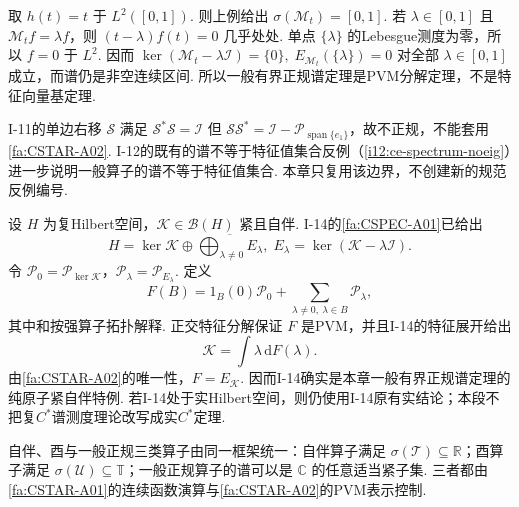 \begin{FAExample}[乘法算子模型族中的非原子正规谱]\label{ii03:nonatomic-example}
取 \(\displaystyle h(t)=t\) 于 \(\displaystyle L^2([0,1])\). 则上例给出
\(\displaystyle \sigma(\mathcal M_t)=[0,1].\)
若 \(\displaystyle\lambda\in[0,1]\) 且 \(\displaystyle\mathcal M_tf=\lambda f\)，则 \(\displaystyle(t-\lambda)f(t)=0\) 几乎处处. 单点 \(\displaystyle\{\lambda\}\) 的Lebesgue测度为零，所以 \(\displaystyle f=0\) 于 \(\displaystyle L^2\). 因而
\(\displaystyle \ker(\mathcal M_t-\lambda\mathcal I)=\{0\}, \; E_{\mathcal M_t}(\{\lambda\})=0\)
对全部 \(\displaystyle\lambda\in[0,1]\) 成立，而谱仍是非空连续区间. 所以一般有界正规谱定理是PVM分解定理，不是特征向量基定理.
\end{FAExample}

\begin{FARemark}[移位算子模型与谱不等于特征值集合的反例边界]
I-11的单边右移 \(\displaystyle\mathcal S\) 满足 \(\displaystyle\mathcal S^*\mathcal S=\mathcal I\) 但 \(\displaystyle\mathcal S\mathcal S^*=\mathcal I-\mathcal P_{\operatorname{span}\{e_1\}}\)，故不正规，不能套用\autoref{fa:CSTAR-A02}. I-12的既有的谱不等于特征值集合反例（\autoref{i12:ce-spectrum-noeig}）进一步说明一般算子的谱不等于特征值集合. 本章只复用该边界，不创建新的规范反例编号.
\end{FARemark}

\begin{FAApplication}[I-14紧自伴谱定理是纯原子特例]\label{ii03:i14-atomic-bridge}
设 \(\displaystyle H\) 为复Hilbert空间，\(\displaystyle\mathcal K\in\mathcal B(H)\) 紧且自伴. I-14的\autoref{fa:CSPEC-A01}已给出
\[
H
=\ker\mathcal K
\oplus
\overline{\bigoplus_{\lambda\neq0}E_\lambda},
\;
E_\lambda=\ker(\mathcal K-\lambda\mathcal I).
\]
令 \(\displaystyle\mathcal P_0=\mathcal P_{\ker\mathcal K}\)，\(\displaystyle\mathcal P_\lambda=\mathcal P_{E_\lambda}\). 定义
\[
F(B)
=1_B(0)\mathcal P_0
+
\sum_{\lambda\neq0,\ \lambda\in B}\mathcal P_\lambda,
\]
其中和按强算子拓扑解释. 正交特征分解保证 \(\displaystyle F\) 是PVM，并且I-14的特征展开给出
\[
\mathcal K=\int\lambda\,\mathrm{d}F(\lambda).
\]
由\autoref{fa:CSTAR-A02}的唯一性，\(\displaystyle F=E_{\mathcal K}\). 因而I-14确实是本章一般有界正规谱定理的纯原子紧自伴特例. 若I-14处于实Hilbert空间，则仍使用I-14原有实结论；本段不把复\(\displaystyle C^*\)谱测度理论改写成实\(\displaystyle C^*\)定理.
\end{FAApplication}

自伴、酉与一般正规三类算子由同一框架统一：自伴算子满足 \(\displaystyle\sigma(\mathcal T)\subseteq\mathbb R\)；酉算子满足 \(\displaystyle\sigma(\mathcal U)\subseteq\mathbb T\)；一般正规算子的谱可以是 \(\displaystyle\mathbb C\) 的任意适当紧子集. 三者都由\autoref{fa:CSTAR-A01}的连续函数演算与\autoref{fa:CSTAR-A02}的PVM表示控制.


